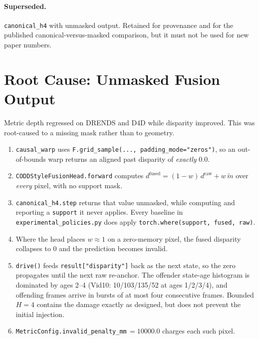 \documentclass[11pt,a4paper]{article}
\begin{document}
\paragraph{Superseded.}
\texttt{canonical\_h4} with unmasked output. Retained for provenance
and for the published canonical-versus-masked comparison, but it must
not be used for new paper numbers.

\section*{Root Cause: Unmasked Fusion Output}

Metric depth regressed on DRENDS and D4D while disparity improved.
This was root-caused to a missing mask rather than to geometry.

\begin{enumerate}[itemsep=2pt]
    \item \texttt{causal\_warp} uses
    \texttt{F.grid\_sample(..., padding\_mode="zeros")}, so an
    out-of-bounds warp returns an aligned past disparity of
    \emph{exactly} $0.0$.
    \item \texttt{CODDStyleFusionHead.forward} computes
    $d^{\text{fused}} = (1-w)\,d^{\text{raw}} + w\,\widetilde{m}$ over
    \emph{every} pixel, with no support mask.
    \item \texttt{canonical\_h4.step} returns that value unmasked,
    while computing and reporting a \texttt{support} it never applies.
    Every baseline in \texttt{experimental\_policies.py} does apply
    \texttt{torch.where(support, fused, raw)}.
    \item Where the head places $w \approx 1$ on a zero-memory pixel,
    the fused disparity collapses to $0$ and the prediction becomes
    invalid.
    \item \texttt{drive()} feeds \texttt{result["disparity"]} back as
    the next state, so the zero propagates until the next raw
    re-anchor. The offender state-age histogram is dominated by ages
    2--4 (Vid10: 10/103/135/52 at ages 1/2/3/4), and offending frames
    arrive in bursts of at most four consecutive frames. Bounded $H=4$
    contains the damage exactly as designed, but does not prevent the
    initial injection.
    \item \texttt{MetricConfig.invalid\_penalty\_mm}$\,=10000.0$
    charges each such pixel.
\end{enumerate}
\end{document}
